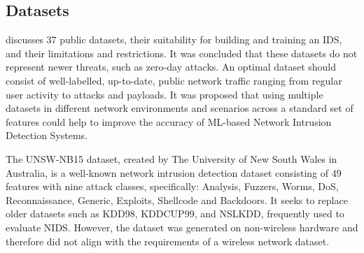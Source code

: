 \subsection{Datasets}

\textcite{9664737} discusses 37 public datasets, their suitability for building and training an IDS, and their limitations and restrictions. It was concluded that these datasets do not represent newer threats, such as zero-day attacks. An optimal dataset should consist of well-labelled, up-to-date, public network traffic ranging from regular user activity to attacks and payloads. It was proposed that using multiple datasets in different network environments and scenarios across a standard set of features could help to improve the accuracy of ML-based Network Intrusion Detection Systems.

\smallskip
The UNSW-NB15 dataset, \parencite{7348942} created by The University of New South Wales in Australia, is a well-known network intrusion detection dataset consisting of 49 features with nine attack classes, specifically: Analysis, Fuzzers, Worms, DoS, Reconnaissance, Generic, Exploits, Shellcode and Backdoors. It seeks to replace older datasets such as KDD98, KDDCUP99, and NSLKDD, frequently used to evaluate NIDS. However, the dataset was generated on non-wireless hardware and therefore did not align with the requirements of a wireless network dataset.
